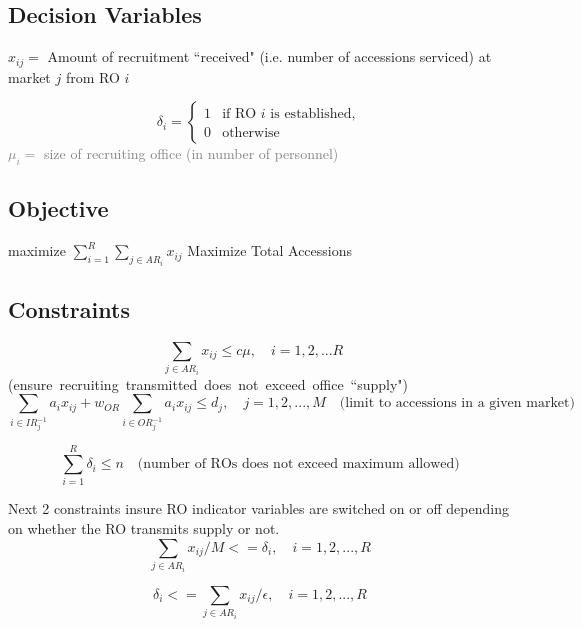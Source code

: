 \documentclass[11pt]{article}
\begin{document}
	\subsection*{Decision Variables}
	$x_{ij} = $ Amount of recruitment ``received" (i.e. number of accessions serviced) at market $j$ from RO $i$\\
{\setlength{\mathindent}{0cm}
\[	\delta_{i} = 
	 \left\{
		 \begin{array}{ll}
			 1 & \mbox{if RO $i$ is established}, \\
			 0 & \mbox{otherwise}
			 \end{array}
			 \right.
			 \]			 
	\textcolor{gray}{$\mu_i = $ size of recruiting office (in number of personnel)}
	
	\subsection*{Objective}
	maximize $\sum\limits_{i=1}^R \sum\limits_{j \in AR_i} x_{ij}$  \qquad Maximize Total Accessions\\
	
	\subsection*{Constraints}
	\begin{equation}  \sum\limits_{j \in AR_i} x_{ij} \le c \mu, 
		\quad i=1,2,...R \quad \end{equation} 
	\mbox{(ensure recruiting transmitted does not exceed office ``supply")} 
	\begin{equation} \sum\limits_{i \in IR_j^{-1}} a_i x_{ij} +
					 w_{OR} \sum\limits_{i \in OR_j^{-1}} a_i x_{ij} 
					\le d_j, \quad j = 1, 2, ..., M \quad 
					\mbox{(limit to accessions in a given market)} \end{equation}
	
	\begin{equation}\sum\limits_{i=1}^{R} \delta_{i} \le n \quad  \mbox{(number of ROs does not exceed maximum allowed)}
	\end{equation} 
	
	Next 2 constraints insure RO indicator variables are switched on or off depending on whether the RO transmits supply or not.	
	\begin{equation}
	\sum\limits_{j \in AR_i} x_{ij} / M <= 	\delta_i, \quad i = 1, 2, ..., R 
	\end{equation}

	\begin{equation}
	\delta_i <= \sum\limits_{j \in AR_i} x_{ij} / \epsilon, \quad i = 1, 2, ..., R
	\end{equation}
	
}
\end{document}
